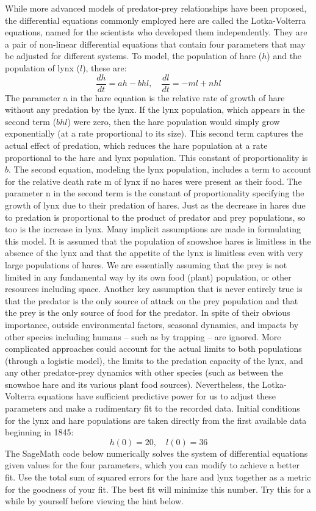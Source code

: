 \documentclass{ximera}
\begin{document}
While more advanced models of predator-prey relationships have been proposed, the differential equations commonly employed here are called the Lotka-Volterra equations, named for the scientists who developed them independently.  They are a pair of non-linear differential equations that contain four parameters that may be adjusted for different systems.  To model, the population of hare ($h$) and the population of lynx ($l$), these are:
$$\frac{dh}{dt}=ah-bhl,\quad\frac{dl}{dt}=-ml+nhl$$
The parameter a in the hare equation is the relative rate of growth of hare without any predation by the lynx.  If the lynx population, which appears in the second term ($bhl$) were zero, then the hare population would simply grow exponentially (at a rate proportional to its size).  This second term captures the actual effect of predation, which reduces the hare population at a rate proportional to the hare and lynx population.  This constant of proportionality is $b$.  The second equation, modeling the lynx population, includes a term to account for the relative death rate m of lynx if no hares were present as their food.  The parameter n in the second term is the constant of proportionality specifying the growth of lynx due to their predation of hares.  Just as the decrease in hares due to predation is proportional to the product of predator and prey populations, so too is the increase in lynx.  Many implicit assumptions are made in formulating this model.  It is assumed that the population of snowshoe hares is limitless in the absence of the lynx and that the appetite of the lynx is limitless even with very large populations of hares.  We are essentially assuming that the prey is not limited in any fundamental way by its own food (plant) population, or other resources including space.  Another key assumption that is never entirely true is that the predator is the only source of attack on the prey population and that the prey is the only source of food for the predator.  In spite of their obvious importance, outside environmental factors, seasonal dynamics, and impacts by other species including humans -- such as by trapping -- are ignored.  More complicated approaches could account for the actual limits to both populations (through a logistic model), the limits to the predation capacity of the lynx, and any other predator-prey dynamics with other species (such as between the snowshoe hare and its various plant food sources).  Nevertheless, the Lotka-Volterra equations have sufficient predictive power for us to adjust these parameters and make a rudimentary fit to the recorded data.
Initial conditions for the lynx and hare populations are taken directly from the first available data beginning in 1845:
$$h(0)=20,\quad l(0)=36$$
The SageMath code below numerically solves the system of differential equations given values for the four parameters, which you can modify to achieve a better fit.  Use the total sum of squared errors for the hare and lynx together as a metric for the goodness of your fit.  The best fit will minimize this number.  Try this for a while by yourself before viewing the hint below.
\end{document}
